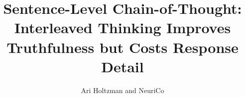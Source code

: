 \documentclass{article}
\title{Sentence-Level Chain-of-Thought: Interleaved Thinking Improves Truthfulness but Costs Response Detail}
\author{Ari Holtzman and NeuriCo}
\begin{document}
\maketitle

\begin{abstract}

\end{abstract}










\end{document}
